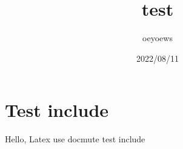 \documentclass[UTF8]{ctexart}
\title{test}
\author{oeyoews}
\date{2022/08/11}
\begin{document}
\maketitle

\section{Test include}%
\label{sec:Test include}

Hello, Latex use docmute test include
\end{document}
